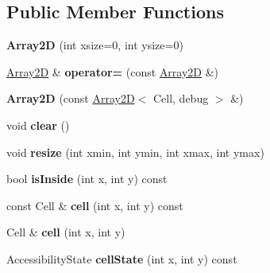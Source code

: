 \subsection*{Public Member Functions}
\begin{DoxyCompactItemize}
\item 
\mbox{\label{classGMapping_1_1Array2D_a0d317f25f3a2873f5be6c0be1ab9fa7b}} 
{\bfseries Array2D} (int xsize=0, int ysize=0)
\item 
\mbox{\label{classGMapping_1_1Array2D_aa91eb3778e1066f9039620a9d2eb0975}} 
\hyperlink{classGMapping_1_1Array2D}{Array2D} \& {\bfseries operator=} (const \hyperlink{classGMapping_1_1Array2D}{Array2D} \&)
\item 
\mbox{\label{classGMapping_1_1Array2D_a08b3d4b4458fb4c6f4e244162d3535ee}} 
{\bfseries Array2D} (const \hyperlink{classGMapping_1_1Array2D}{Array2D}$<$ Cell, debug $>$ \&)
\item 
\mbox{\label{classGMapping_1_1Array2D_a3b5152ab2325ec1b2bd900a305a7e6cf}} 
void {\bfseries clear} ()
\item 
\mbox{\label{classGMapping_1_1Array2D_a07aee668640ab602d07a7b0c7192a180}} 
void {\bfseries resize} (int xmin, int ymin, int xmax, int ymax)
\item 
\mbox{\label{classGMapping_1_1Array2D_a25959e968883eefc2cbcdf9fa1d62a90}} 
bool {\bfseries is\+Inside} (int x, int y) const
\item 
\mbox{\label{classGMapping_1_1Array2D_aed1ef167b9dd53140b303ebddd2d9dcc}} 
const Cell \& {\bfseries cell} (int x, int y) const
\item 
\mbox{\label{classGMapping_1_1Array2D_a12a931e92317de998eaac698e27bfbc6}} 
Cell \& {\bfseries cell} (int x, int y)
\item 
\mbox{\label{classGMapping_1_1Array2D_aa91d0ae63e36de075e5f2600de9bd82e}} 
Accessibility\+State {\bfseries cell\+State} (int x, int y) const
\item 

\end{DoxyCompactItemize}
